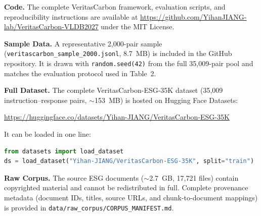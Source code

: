 \noindent\textbf{Code.} The complete VeritasCarbon framework, evaluation scripts, and reproducibility instructions are available at \url{https://github.com/YihanJIANG-lab/VeritasCarbon-VLDB2027} under the MIT License.

\noindent\textbf{Sample Data.} A representative 2,000-pair sample (\texttt{veritascarbon\_sample\_2000.jsonl}, 8.7~MB) is included in the GitHub repository. It is drawn with \texttt{random.seed(42)} from the full 35,009-pair pool and matches the evaluation protocol used in Table~2.

\noindent\textbf{Full Dataset.} The complete VeritasCarbon-ESG-35K dataset (35,009 instruction--response pairs, $\sim$153~MB) is hosted on Hugging Face Datasets:
\begin{center}
\url{https://huggingface.co/datasets/Yihan-JIANG/VeritasCarbon-ESG-35K}
\end{center}
It can be loaded in one line:
\begin{lstlisting}[language=Python]
from datasets import load_dataset
ds = load_dataset("Yihan-JIANG/VeritasCarbon-ESG-35K", split="train")
\end{lstlisting}

\noindent\textbf{Raw Corpus.} The source ESG documents ($\sim$2.7~GB, 17,721 files) contain copyrighted material and cannot be redistributed in full. Complete provenance metadata (document IDs, titles, source URLs, and chunk-to-document mappings) is provided in \texttt{data/raw\_corpus/CORPUS\_MANIFEST.md}.
